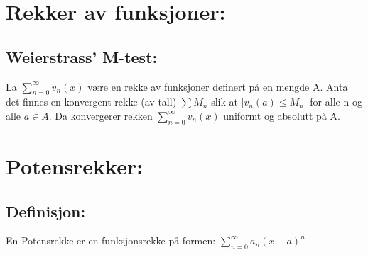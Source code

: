 \documentclass[8pt,a4paper,twocolumn,twoside]{article}
\def\abs#1{\lvert #1 \rvert}
\def\suminfty#1#2{\sum_{n=#1}^\infty #2}
\begin{document}
    \section*{Rekker av funksjoner:}
        \subsection*{Weierstrass' M-test:}
        La $\suminfty{0}{v_n(x)}$ være en rekke av funksjoner definert på en mengde A. Anta det finnes en konvergent rekke (av tall) $\sum M_n$ slik at 
        $\abs{v_n(a) \leq M_n}$ for alle n og alle $a\in A$. Da konvergerer rekken $\suminfty{0}{v_n(x)}$ uniformt og absolutt på A.
    \section*{Potensrekker:}
        \subsection*{Definisjon:}
        En Potensrekke er en funksjonsrekke på formen: $\suminfty{0}{a_n(x-a)^n}$
\end{document}
